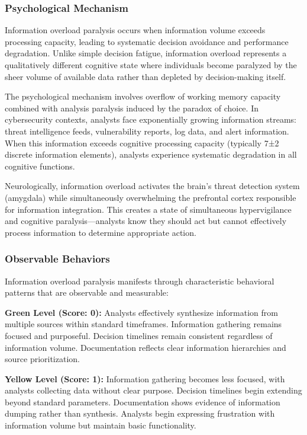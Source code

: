 \documentclass[11pt,a4paper]{article}
\begin{document}
\subsubsection{Psychological Mechanism}

Information overload paralysis occurs when information volume exceeds processing capacity, leading to systematic decision avoidance and performance degradation\cite{eppler2004}. Unlike simple decision fatigue, information overload represents a qualitatively different cognitive state where individuals become paralyzed by the sheer volume of available data rather than depleted by decision-making itself.

The psychological mechanism involves overflow of working memory capacity combined with analysis paralysis induced by the paradox of choice\cite{schwartz2004}. In cybersecurity contexts, analysts face exponentially growing information streams: threat intelligence feeds, vulnerability reports, log data, and alert information. When this information exceeds cognitive processing capacity (typically 7±2 discrete information elements), analysts experience systematic degradation in all cognitive functions.

Neurologically, information overload activates the brain's threat detection system (amygdala) while simultaneously overwhelming the prefrontal cortex responsible for information integration\cite{arnsten2009}. This creates a state of simultaneous hypervigilance and cognitive paralysis---analysts know they should act but cannot effectively process information to determine appropriate action.

\subsubsection{Observable Behaviors}

Information overload paralysis manifests through characteristic behavioral patterns that are observable and measurable:

\textbf{Green Level (Score: 0):} Analysts effectively synthesize information from multiple sources within standard timeframes. Information gathering remains focused and purposeful. Decision timelines remain consistent regardless of information volume. Documentation reflects clear information hierarchies and source prioritization.

\textbf{Yellow Level (Score: 1):} Information gathering becomes less focused, with analysts collecting data without clear purpose. Decision timelines begin extending beyond standard parameters. Documentation shows evidence of information dumping rather than synthesis. Analysts begin expressing frustration with information volume but maintain basic functionality.
\end{document}
